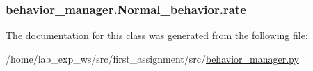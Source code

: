 \subsubsection[{\texorpdfstring{rate}{rate}}]{\setlength{\rightskip}{0pt plus 5cm}behavior\+\_\+manager.\+Normal\+\_\+behavior.\+rate}\hypertarget{classbehavior__manager_1_1Normal__behavior_a8c0881c34370caec4f5298f0ebe35489}{}\label{classbehavior__manager_1_1Normal__behavior_a8c0881c34370caec4f5298f0ebe35489}


The documentation for this class was generated from the following file\+:\begin{DoxyCompactItemize}
\item 
/home/lab\+\_\+exp\+\_\+ws/src/first\+\_\+assignment/src/\hyperlink{behavior__manager_8py}{behavior\+\_\+manager.\+py}\end{DoxyCompactItemize}
